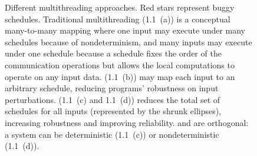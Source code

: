 \begin{figure}[t]
\begin{center}
\vspace{-.05in}
\caption{Different multithreading approaches. Red stars represent buggy
schedules. Traditional multithreading (1.1~(a)) is a conceptual many-to-many
mapping where one input may execute under many schedules because of
nondeterminism, and many inputs may execute under one schedule because a
schedule fixes the order of the communication operations but allows the local
computations to operate on any input data. \dmt (1.1~(b)) may map each input to
an arbitrary schedule, reducing programs' robustness on input perturbations. 
\smt (1.1~(c) and 1.1~(d)) reduces the total set of schedules for all inputs
(represented by the shrunk ellipses), increasing robustness and improving
reliability. \smt and \dmt are orthogonal: a \smt system can be deterministic
(1.1~(c)) or nondeterministic (1.1~(d)).}
\vspace{-.2in}
\end{center}
\end{figure}


